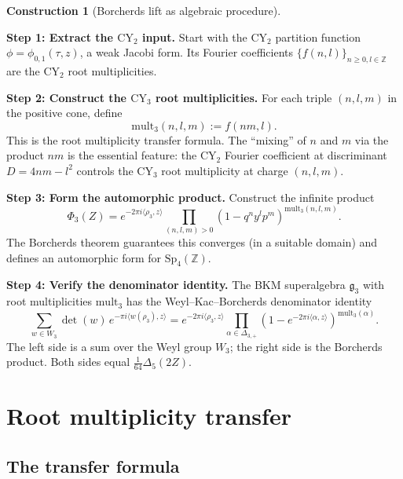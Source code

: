 \documentclass[11pt]{article}
\theoremstyle{plain}
\theoremstyle{definition}
\newtheorem{construction}[theorem]{Construction}
\theoremstyle{remark}
\newcommand{\CY}{\mathrm{CY}}
\begin{document}
\begin{construction}[Borcherds lift as algebraic procedure]
\label{constr:borcherds-algebraic}
\

\medskip
\noindent\textbf{Step 1: Extract the $\CY_2$ input.}
Start with the $\CY_2$ partition function $\phi = \phi_{0,1}(\tau, z)$, a weak
Jacobi form. Its Fourier coefficients $\{f(n, l)\}_{n \geq 0, l \in \mathbb{Z}}$
are the $\CY_2$ root multiplicities.

\medskip
\noindent\textbf{Step 2: Construct the $\CY_3$ root multiplicities.}
For each triple $(n, l, m)$ in the positive cone, define
\[
 \mathrm{mult}_3(n, l, m) := f(nm, l).
\]
This is the root multiplicity transfer formula. The ``mixing'' of $n$ and $m$
via the product $nm$ is the essential feature: the $\CY_2$ Fourier coefficient
at discriminant $D = 4nm - l^2$ controls the $\CY_3$ root multiplicity at
charge $(n, l, m)$.

\medskip
\noindent\textbf{Step 3: Form the automorphic product.}
Construct the infinite product
\[
 \Phi_3(Z) = e^{-2\pi i \langle \rho_3, z \rangle}
 \prod_{(n,l,m) > 0} (1 - q^n y^l p^m)^{\mathrm{mult}_3(n,l,m)}.
\]
The Borcherds theorem guarantees this converges (in a suitable domain) and
defines an automorphic form for $\mathrm{Sp}_4(\mathbb{Z})$.

\medskip
\noindent\textbf{Step 4: Verify the denominator identity.}
The BKM superalgebra $\mathfrak{g}_3$ with root multiplicities $\mathrm{mult}_3$
has the Weyl--Kac--Borcherds denominator identity
\[
 \sum_{w \in W_3} \det(w) \, e^{-\pi i \langle w(\rho_3), z \rangle}
 = e^{-2\pi i \langle \rho_3, z \rangle}
 \prod_{\alpha \in \Delta_{3,+}} (1 - e^{-2\pi i \langle \alpha, z \rangle})^{\mathrm{mult}_3(\alpha)}.
\]
The left side is a sum over the Weyl group $W_3$; the right side is the
Borcherds product. Both sides equal $\frac{1}{64} \Delta_5(2Z)$.
\end{construction}

\section{Root multiplicity transfer}
\label{sec:fib-root-mult}

\subsection{The transfer formula}
\label{subsec:transfer-formula}
\end{document}
